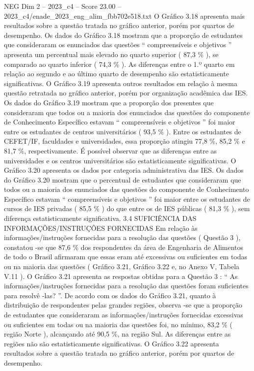 \begin{textsample}{NEG Dim 2 – 2023\_c4 – Score 23.00 – 2023\_c4/enade\_2023\_eng\_alim\_fbb702e518.txt}
O Gráfico 3.18 apresenta mais resultados sobre a questão tratada no gráfico anterior, porém por quartos de desempenho.
Os dados do Gráfico 3.18 mostram que a proporção de estudantes que consideraram os enunciados das questões “ compreensíveis e objetivos ” apresenta um percentual mais elevado no quarto superior ( 87,3 \% ), se comparado ao quarto inferior ( 74,3 \% ).
As diferenças entre o 1.º quarto em relação ao segundo e ao último quarto de desempenho são estatisticamente significativas.
O Gráfico 3.19 apresenta outros resultados em relação à mesma questão retratada no gráfico anterior, porém por organização acadêmica das IES.
Os dados do Gráfico 3.19 mostram que a proporção dos presentes que consideraram que todos ou a maioria dos enunciados das questões do componente de Conhecimento Específico estavam “ compreensíveis e objetivos ” foi maior entre os estudantes de centros universitários ( 93,5 \% ).
Entre os estudantes de CEFET/IF, faculdades e universidades, essa proporção atingiu 77,8 \%, 85,2 \% e 81,7 \%, respectivamente.
É possível observar que as diferenças entre as universidades e os centros universitários são estatisticamente significativas.
O Gráfico 3.20 apresenta os dados por categoria administrativa das IES.
Os dados do Gráfico 3.20 mostram que o percentual de estudantes que consideraram que todos ou a maioria dos enunciados das questões do componente de Conhecimento Específico estavam “ compreensíveis e objetivos ” foi maior entre os estudantes de cursos de IES privadas ( 85,5 \% ) do que entre os de IES públicas ( 81,3 \% ), sem diferença estatisticamente significativa. 3.4 SUFICIÊNCIA DAS INFORMAÇÕES/INSTRUÇÕES FORNECIDAS Em relação às informações/instruções fornecidas para a resolução das questões ( Questão 3 ), constatou -se que 87,6 \% dos respondentes da área de Engenharia de Alimentos de todo o Brasil afirmaram que essas eram até excessivas ou suficientes em todas ou na maioria das questões ( Gráfico 3.21, Gráfico 3.22 e, no Anexo V, Tabela V.11 ).
O Gráfico 3.21 apresenta as respostas obtidas para a Questão 3 : “ As informações/instruções fornecidas para a resolução das questões foram suficientes para resolvê -las? ”.
De acordo com os dados do Gráfico 3.21, quanto à distribuição de respondentes pelas grandes regiões, observa -se que a proporção de estudantes que consideraram as informações/instruções fornecidas excessivas ou suficientes em todas ou na maioria das questões foi, no mínimo, 83,2 \% ( região Norte ), alcançando até 90,5 \%, na região Sul.
As diferenças entre as regiões não são estatisticamente significativas.
O Gráfico 3.22 apresenta resultados sobre a questão tratada no gráfico anterior, porém por quartos de desempenho.

\end{textsample}
